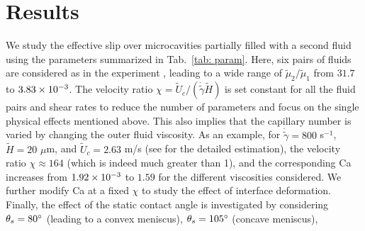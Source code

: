 
%


\section{Results} \label{results}

We study the effective slip over microcavities partially filled with a second fluid using the parameters summarized in Tab.\ \ref{tab: param}.
Here, six pairs of fluids are considered as in the experiment \cite{Solomon}, leading to a wide range of $\tilde{\mu}_2/\tilde{\mu}_1$ from $31.7$ to $3.83\times 10^{-3}$.  The velocity ratio $\chi=\tilde{U}_c/ (\dot{\tilde{\gamma}} \tilde{H})$ is set constant for all the fluid pairs and shear rates to reduce the number of parameters and focus on the single physical effects mentioned above. This also implies that the capillary number is varied by changing the outer fluid viscosity. As an example, for $\dot{\tilde{\gamma}}=800$ s$^{-1}$, $\tilde{H}=20$ $\mu$m, and $\tilde{U}_c=2.63$ m/s (see \cite{dimension} for the detailed estimation), the velocity ratio $\chi \approx 164$ (which is indeed much greater than 1), and the corresponding Ca increases from $1.92\times 10^{-3}$ to $1.59$ for the different viscosities considered. We further modify Ca at a fixed $\chi$ to study the effect of interface deformation. Finally, the effect of the static contact angle is investigated by considering $\theta_s=80\degree$ (leading to a convex meniscus), $\theta_s=105\degree$ (concave meniscus), 

